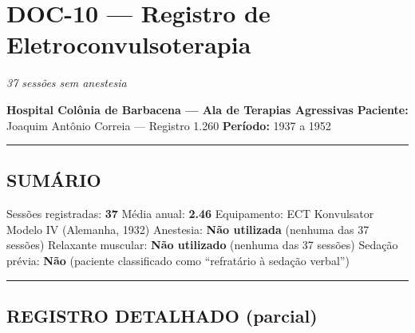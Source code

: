 \section*{\textbf{DOC-10} --- Registro de Eletroconvulsoterapia}

\noindent \textit{37 sessões sem anestesia}

\noindent \textbf{Hospital Colônia de Barbacena --- Ala de Terapias Agressivas}
\textbf{Paciente:} Joaquim Antônio Correia --- Registro 1.260
\textbf{Período:} 1937 a 1952

\vspace{0.5em}\noindent\rule{\textwidth}{0.5pt}\vspace{0.5em}

\subsection*{SUMÁRIO}

\noindent Sessões registradas: \textbf{37}
Média anual: \textbf{2.46}
Equipamento: ECT Konvulsator Modelo IV (Alemanha, 1932)
Anestesia: \textbf{Não utilizada} (nenhuma das 37 sessões)
Relaxante muscular: \textbf{Não utilizado} (nenhuma das 37 sessões)
Sedação prévia: \textbf{Não} (paciente classificado como \textquotedblleft{}refratário à sedação verbal\textquotedblright{})

\vspace{0.5em}\noindent\rule{\textwidth}{0.5pt}\vspace{0.5em}

\subsection*{REGISTRO DETALHADO (parcial)}

